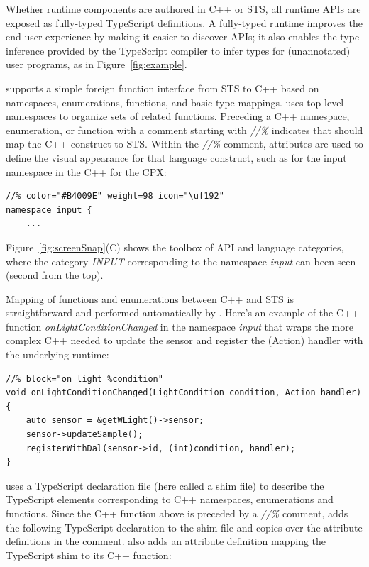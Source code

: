 Whether runtime components are authored in C++ or STS, all runtime APIs are exposed as fully-typed
TypeScript definitions. A fully-typed runtime improves the end-user experience
by making it easier to discover APIs; it also enables the type inference provided by the TypeScript
compiler to infer types for (unannotated) user programs, as in Figure~\ref{fig:example}.

\MC supports a simple foreign function interface from STS to C++ based on namespaces,
enumerations, functions, and basic type mappings. \MC uses top-level namespaces to organize sets of related functions.  Preceding a C++ namespace, enumeration, or function
with a comment starting with \emph{//\%} indicates that \MC should map the C++ construct to STS.
Within the \emph{//\%} comment, attributes are used to define the visual appearance for that
language construct, such as for the input namespace in the C++ for the CPX:
\begin{lstlisting}
//% color="#B4009E" weight=98 icon="\uf192"
namespace input {
    ...
\end{lstlisting}

Figure~\ref{fig:screenSnap}(C) shows the toolbox of API and language categories, where the
category \emph{INPUT} corresponding to the namespace \emph{input} can been seen (second
from the top).

Mapping of functions and enumerations between C++ and STS is straightforward
and performed automatically by \MC.
Here's an example of the C++ function \emph{onLightConditionChanged}
in the namespace \emph{input} that
wraps the more complex C++ needed to update the sensor and register the (Action)
handler with the underlying \CO runtime:
\begin{lstlisting}
//% block="on light %condition"
void onLightConditionChanged(LightCondition condition, Action handler) {
    auto sensor = &getWLight()->sensor;
    sensor->updateSample();
    registerWithDal(sensor->id, (int)condition, handler);
}
\end{lstlisting}

\MC uses a TypeScript declaration file (here called a shim file) to describe the TypeScript
elements corresponding to C++ namespaces, enumerations and functions.
Since the C++ function above is preceded by a \emph{//\%} comment,
\MC adds the following TypeScript declaration to the shim file and copies
over the attribute definitions in the comment. \MC also adds an attribute definition mapping
the TypeScript shim to its C++ function:

